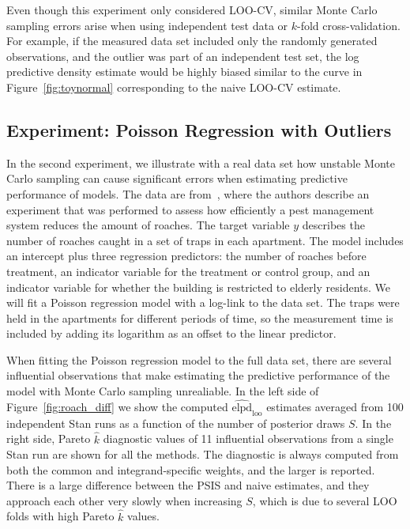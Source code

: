 \documentclass[12pt]{article}
\begin{document}
Even though this experiment only considered LOO-CV, similar Monte Carlo
sampling errors arise when using independent test data or $k$-fold cross-validation.
For example, if the measured data set included only the randomly generated observations, and the outlier
was part of an independent test set, the log predictive density
estimate would be highly biased similar to the curve in Figure~\ref{fig:toynormal}
corresponding to the naive LOO-CV estimate.








\subsection{Experiment: Poisson Regression with Outliers} \label{sec:poisson}




In the second experiment, we illustrate with a real data set
how unstable Monte Carlo sampling can cause significant errors when estimating predictive performance of models.
The data are from~\citet{gelman2006data}, where the authors describe an experiment that was performed to assess
how efficiently a pest management system reduces the amount of roaches. The target variable $y$ describes the number of roaches
caught in a set of traps in each apartment. The model includes an intercept plus three regression predictors: the number of roaches before treatment, an indicator variable for the treatment or control group, and an indicator variable for whether the building is restricted
to elderly residents.
We will fit a Poisson regression model with a log-link to the data set.
The traps were held in the apartments for different periods of time, so the measurement time is included by adding its logarithm as an offset to the linear predictor.







When fitting the Poisson regression model to the full data set, there are several influential observations that
make estimating the predictive performance of the model with Monte Carlo sampling unrealiable.
In the left side of Figure~\ref{fig:roach_diff} we show the computed $\widehat{\mathrm{elpd}}_{\mathrm{loo}}$
estimates averaged from 100 independent Stan runs as a function of the number of posterior draws $S$.
In the right side, Pareto $\hat{k}$ diagnostic values of 11 influential observations from a single Stan run are shown
for all the methods. The diagnostic is always computed from both
the common and integrand-specific weights, and the larger is reported.
There is a large difference between the PSIS and naive estimates, and they approach each other
very slowly
when increasing $S$, which is due to several LOO folds with high Pareto $\hat{k}$ values.
\end{document}
